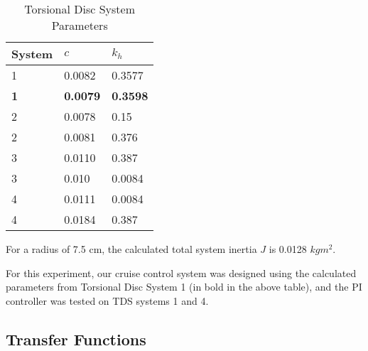 \documentclass[11pt,titlepage]{article}
\begin{document}
    
            \begin{table}[h!]
            \centering
            \begin{tabular}{|m{4cm}|m{3cm}|m{3cm}|} 
                \hline
                System & $c$ &$k_h$ \\ 
                \hline
                1 &  0.0082 & 0.3577\\
                \hline
                \textbf{1} & \textbf{0.0079} & \textbf{0.3598}\\
                \hline
                2 & 0.0078 & 0.15\\
                \hline
                2 & 0.0081 & 0.376\\
                \hline
                3 & 0.0110 & 0.387\\
                \hline
                3 & 0.010 & 0.0084\\
                \hline
                4 & 0.0111 & 0.0084\\
                \hline
                4 & 0.0184 & 0.387\\
                \hline
            \end{tabular}
            \caption{Torsional Disc System Parameters} \label{table:TDS_param}
        \end{table}
        
        For a radius of 7.5 cm, the calculated total system inertia $J$ is 0.0128 $kg m^2$.
        
        For this experiment, our cruise control system was designed using the calculated parameters from Torsional Disc System 1 (in bold in the above table), and the PI controller was tested on TDS systems 1 and 4.

    \subsection{Transfer Functions}
    
\end{document}
